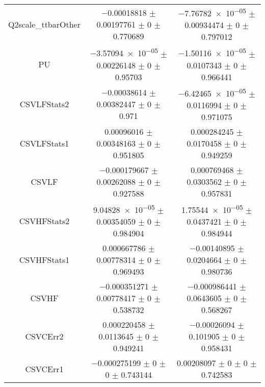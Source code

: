 \begin{table}
\begin{tabular}{ccc}
Q2scale\_ttbarOther & \num{-0.00018818} $\pm$ \num{0.00197761} $\pm$ \num{0} $\pm$ \num{0.770689} & \num{-7.76782e-05} $\pm$ \num{0.00934474} $\pm$ \num{0} $\pm$ \num{0.797012}\\
PU & \num{-3.57094e-05} $\pm$ \num{0.00226148} $\pm$ \num{0} $\pm$ \num{0.95703} & \num{-1.50116e-05} $\pm$ \num{0.0107343} $\pm$ \num{0} $\pm$ \num{0.966441}\\
CSVLFStats2 & \num{-0.00038614} $\pm$ \num{0.00382447} $\pm$ \num{0} $\pm$ \num{0.971} & \num{-6.42465e-05} $\pm$ \num{0.0116994} $\pm$ \num{0} $\pm$ \num{0.971075}\\
CSVLFStats1 & \num{0.00096016} $\pm$ \num{0.00348163} $\pm$ \num{0} $\pm$ \num{0.951805} & \num{0.000284245} $\pm$ \num{0.0170458} $\pm$ \num{0} $\pm$ \num{0.949259}\\
CSVLF & \num{-0.000179667} $\pm$ \num{0.00262088} $\pm$ \num{0} $\pm$ \num{0.927588} & \num{0.000769468} $\pm$ \num{0.0303562} $\pm$ \num{0} $\pm$ \num{0.957831}\\
CSVHFStats2 & \num{9.04828e-05} $\pm$ \num{0.00354059} $\pm$ \num{0} $\pm$ \num{0.984904} & \num{1.75544e-05} $\pm$ \num{0.0437421} $\pm$ \num{0} $\pm$ \num{0.984944}\\
CSVHFStats1 & \num{0.000667786} $\pm$ \num{0.00778314} $\pm$ \num{0} $\pm$ \num{0.969493} & \num{-0.00140895} $\pm$ \num{0.0204664} $\pm$ \num{0} $\pm$ \num{0.980736}\\
CSVHF & \num{-0.000351271} $\pm$ \num{0.00778417} $\pm$ \num{0} $\pm$ \num{0.538732} & \num{-0.000986441} $\pm$ \num{0.0643605} $\pm$ \num{0} $\pm$ \num{0.568267}\\
CSVCErr2 & \num{0.000220458} $\pm$ \num{0.0113645} $\pm$ \num{0} $\pm$ \num{0.949241} & \num{-0.00026094} $\pm$ \num{0.101905} $\pm$ \num{0} $\pm$ \num{0.958431}\\
CSVCErr1 & \num{-0.000275199} $\pm$ \num{0} $\pm$ \num{0} $\pm$ \num{0.743144} & \num{0.00208097} $\pm$ \num{0} $\pm$ \num{0} $\pm$ \num{0.742583}\\
\bottomrule
\end{tabular}
\end{table}
